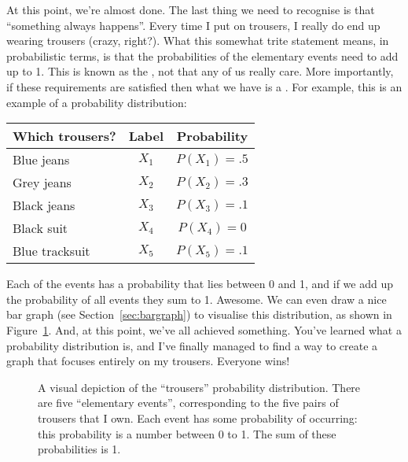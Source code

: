 At this point, we're almost done. The last thing we need to recognise is that ``something always happens''. Every time I put on trousers, I really do end up wearing trousers (crazy, right?). What this somewhat trite statement means, in probabilistic terms, is that the probabilities of the elementary events need to add up to 1. This is known as the , not that any of us really care. More importantly, if these requirements are satisfied then what we have is a . For example, this is an example of a probability distribution:
\begin{center}
\begin{tabular}{lcc} 
Which trousers?     &  Label & Probability \\ \hline
Blue jeans &  $X_1$ & $P(X_1) = .5 $ \\
Grey jeans  &  $X_2$ & $P(X_2) = .3 $ \\
Black jeans      &  $X_3$ & $P(X_3) = .1 $ \\
Black suit       &  $X_4$ & $P(X_4) = 0  $ \\
Blue tracksuit  &  $X_5$ & $P(X_5) = .1 $ \\
\end{tabular}
\end{center}
Each of the events has a probability that lies between 0 and 1, and if we add up the probability of all events they sum to 1. Awesome. We can even draw a nice bar graph (see Section~\ref{sec:bargraph}) to visualise this distribution, as shown in Figure~\ref{fig:pantsprob}. And, at this point, we've all achieved something. You've learned what a probability distribution is, and I've finally managed to find a way to create a graph that focuses entirely on my trousers. Everyone wins!

\begin{figure}[!!htb]
\begin{center}
\caption{A visual depiction of the ``trousers'' probability distribution. There are five ``elementary events'', corresponding to the five pairs of trousers that I own. Each event has some probability of occurring: this probability is a number between 0 to 1. The sum of these probabilities is 1.}
\label{fig:pantsprob}
\HR
\end{center}
\end{figure}

